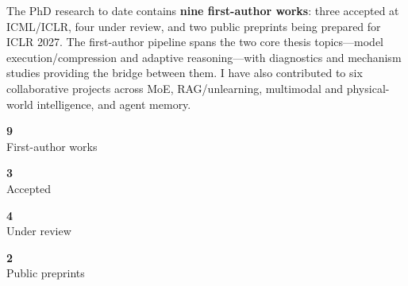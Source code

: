 \documentclass[12pt,a4paper]{article}
\begin{document}
The PhD research to date contains \textbf{nine first-author works}: three accepted at ICML/ICLR, four under review, and two public preprints being prepared for ICLR 2027. The first-author pipeline spans the two core thesis topics---model execution/compression and adaptive reasoning---with diagnostics and mechanism studies providing the bridge between them. I have also contributed to six collaborative projects across MoE, RAG/unlearning, multimodal and physical-world intelligence, and agent memory.

\begin{tcbraster}[raster columns=4,raster equal height=rows,raster column skip=5pt]
\begin{tcolorbox}[colback=SoftBlue,colframe=NTUblue!60,boxrule=0.45pt,arc=1.5pt,halign=center]
{\fontsize{20}{22}\selectfont\bfseries\color{NTUblue}9}\\[-1mm]\textsf{\small First-author works}
\end{tcolorbox}
\begin{tcolorbox}[colback=SoftTeal,colframe=Teal!60,boxrule=0.45pt,arc=1.5pt,halign=center]
{\fontsize{20}{22}\selectfont\bfseries\color{Teal}3}\\[-1mm]\textsf{\small Accepted}
\end{tcolorbox}
\begin{tcolorbox}[colback=SoftGray,colframe=DarkGray!45,boxrule=0.45pt,arc=1.5pt,halign=center]
{\fontsize{20}{22}\selectfont\bfseries\color{DarkGray}4}\\[-1mm]\textsf{\small Under review}
\end{tcolorbox}
\begin{tcolorbox}[colback=SoftRed,colframe=NTUred!55,boxrule=0.45pt,arc=1.5pt,halign=center]
{\fontsize{20}{22}\selectfont\bfseries\color{NTUred}2}\\[-1mm]\textsf{\small Public preprints}
\end{tcolorbox}
\end{tcbraster}
\end{document}
